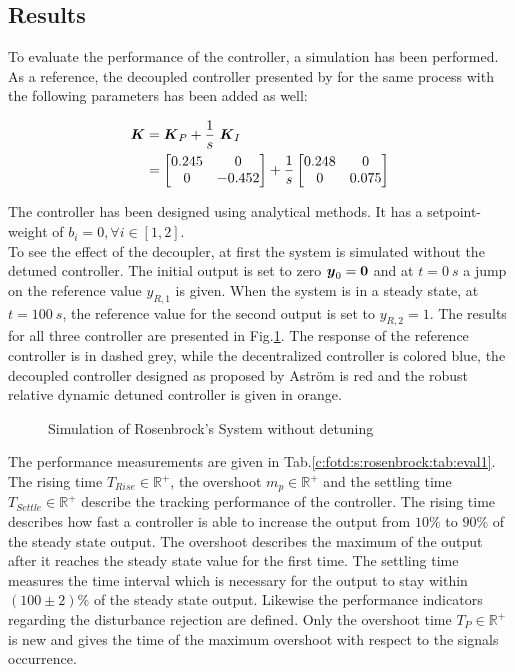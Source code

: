 \subsection{Results}
\label{c:fotd:s:rosenbrocks:ss:results}

To evaluate the performance of the controller, a simulation has been performed. As a reference, the decoupled controller presented by \cite{Astrom2001a} for the same process with the following parameters has been added as well:

\begin{align*}
\mbox{\boldmath$K$} &= \mbox{\boldmath$K$}_P + \frac{1}{s}~ \mbox{\boldmath$K$}_I\\
&= \begin{bmatrix}
0.245 & 0 \\
0 & -0.452
\end{bmatrix}
+ \frac{1}{s}\begin{bmatrix}
0.248 & 0 \\
0 & 0.075
\end{bmatrix}
\end{align*}

The controller has been designed using analytical methods. It has a setpoint-weight of $b_i = 0, \forall i \in [1,2]$.\\

To see the effect of the decoupler, at first the system is simulated without the detuned controller.  The initial output is set to zero $\mbox{\boldmath$y$}_0 = \mbox{\boldmath$0$}$ and at $t = 0~s$ a jump on the reference value $y_{R,1}$ is given. When the system is in a steady state, at $t = 100~s$, the reference value for the second output is set to $y_{R,2} = 1$. The results for all three controller are presented in Fig.\ref{c:fotd:s:rosenbrock:f:SimNonDetuned}. The response of the reference controller is in dashed grey, while the decentralized controller is colored blue, the decoupled controller designed as proposed by Astr\"om is red and the robust relative dynamic detuned controller is given in orange.\\

\begin{figure}[H]\centering

\caption{Simulation of Rosenbrock's System without detuning}
\label{c:fotd:s:rosenbrock:f:SimNonDetuned}
\end{figure}

The performance measurements are given in Tab.\ref{c:fotd:s:rosenbrock:tab:eval1}. The rising time $T_{Rise} \in \mathbb{R}^+$, the overshoot $m_p \in \mathbb{R}^+$ and the settling time $T_{Settle} \in \mathbb{R}^+$ describe the tracking performance of the controller. The rising time describes how fast a controller is able to increase the output from $10\%$ to $90\%$ of the steady state output. The overshoot describes the maximum of the output after it reaches the steady state value for the first time. The settling time measures the time interval which is necessary for the output to stay within $\left(100 \pm 2\right)\%$ of the steady state output. Likewise the performance indicators regarding the disturbance rejection are defined. Only the overshoot time $T_P \in \mathbb{R}^+$ is new and gives the time of the maximum overshoot with respect to the signals occurrence. 

